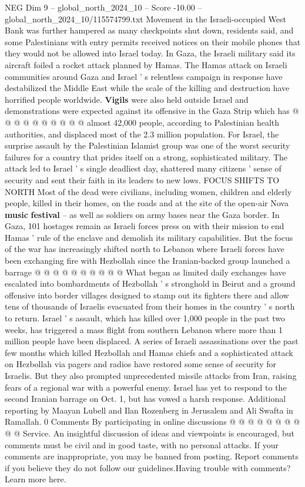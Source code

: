 \begin{textsample}{NEG Dim 9 – global\_north\_2024\_10 – Score -10.00 – global\_north\_2024\_10/115574799.txt}
Movement in the Israeli-occupied West Bank was further hampered as many checkpoints shut down, residents said, and some Palestinians with entry permits received notices on their mobile phones that they would not be allowed into Israel today.
In Gaza, the Israeli military said its aircraft foiled a rocket attack planned by Hamas.
The Hamas attack on Israeli communities around Gaza and Israel ' s relentless campaign in response have destabilized the Middle East while the scale of the killing and destruction have horrified people worldwide. \textbf{Vigils} were also held outside Israel and demonstrations were expected against its offensive in the Gaza Strip which has @ @ @ @ @ @ @ @ @ @ almost 42,000 people, according to Palestinian health authorities, and displaced most of the 2.3 million population.
For Israel, the surprise assault by the Palestinian Islamist group was one of the worst security failures for a country that prides itself on a strong, sophisticated military.
The attack led to Israel ' s single deadliest day, shattered many citizens ' sense of security and sent their faith in its leaders to new lows.
FOCUS SHIFTS TO NORTH Most of the dead were civilians, including women, children and elderly people, killed in their homes, on the roads and at the site of the open-air Nova \textbf{music} \textbf{festival} -- as well as soldiers on army bases near the Gaza border.
In Gaza, 101 hostages remain as Israeli forces press on with their mission to end Hamas ' rule of the enclave and demolish its military capabilities.
But the focus of the war has increasingly shifted north to Lebanon where Israeli forces have been exchanging fire with Hezbollah since the Iranian-backed group launched a barrage @ @ @ @ @ @ @ @ @ @ What began as limited daily exchanges have escalated into bombardments of Hezbollah ' s stronghold in Beirut and a ground offensive into border villages designed to stamp out its fighters there and allow tens of thousands of Israelis evacuated from their homes in the country ' s north to return.
Israel ' s assault, which has killed over 1,000 people in the past two weeks, has triggered a mass flight from southern Lebanon where more than 1 million people have been displaced.
A series of Israeli assassinations over the past few months which killed Hezbollah and Hamas chiefs and a sophisticated attack on Hezbollah via pagers and radios have restored some sense of security for Israelis.
But they also prompted unprecedented missile attacks from Iran, raising fears of a regional war with a powerful enemy.
Israel has yet to respond to the second Iranian barrage on Oct. 1, but has vowed a harsh response.
Additional reporting by Maayan Lubell and Ilan Rozenberg in Jerusalem and Ali Swafta in Ramallah. 0 Comments By participating in online discussions @ @ @ @ @ @ @ @ @ @ Service.
An insightful discussion of ideas and viewpoints is encouraged, but comments must be civil and in good taste, with no personal attacks.
If your comments are inappropriate, you may be banned from posting.
Report comments if you believe they do not follow our guidelines.Having trouble with comments?
Learn more here.


\end{textsample}
